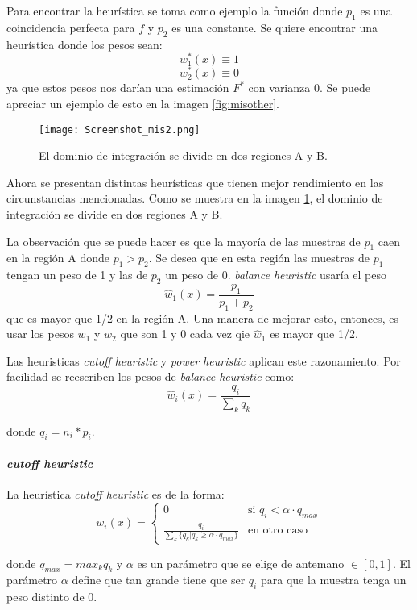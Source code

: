 \documentclass{article}
\begin{document}
Para encontrar la heurística se toma como ejemplo la función donde $p_{1}$ es una coincidencia perfecta para $f$ y $p_{2}$ es una constante.
Se quiere encontrar una heurística donde los pesos sean:
$$w^{*}_{1}(x) \equiv 1$$
$$w^{*}_{2}(x) \equiv 0$$
ya que estos pesos nos darían una estimación $F^{*}$ con varianza 0.
Se puede apreciar un ejemplo de esto en la imagen \ref{fig:misother}.

\begin{figure}[H]
\centering
\texttt{[image: Screenshot\_mis2.png]}
\caption{El dominio de integración se divide en dos regiones A y B.}
\label{fig:misother2}
\end{figure}

Ahora se presentan distintas heurísticas que tienen mejor rendimiento en las circunstancias mencionadas.
Como se muestra en la imagen \ref{fig:misother2}, el dominio de integración se divide en dos regiones A y B.

La observación que se puede hacer es que la mayoría de las muestras de $p_{1}$ caen en la región A donde $p_{1} > p_{2}$.
Se desea que en esta región las muestras de $p_{1}$ tengan un peso de 1 y las de $p_{2}$ un peso de 0.
\textit{balance heuristic} usaría el peso
$$ \hat{w}_{1}(x) = \frac{p_1}{p_1 + p_2} $$
que es mayor que 1/2 en la región A. Una manera de mejorar esto, entonces, es usar los pesos $w_{1}$ y $w_{2}$ que son 1 y 0 cada vez qie $\hat{w}_{1}$ es mayor que 1/2.

Las heuristicas \textit{cutoff heuristic} y \textit{power heuristic} aplican este razonamiento.
Por facilidad se reescriben los pesos de \textit{balance heuristic} como:
$$ \hat{w}_{i}(x) = \frac{q_{i}}{\sum_{k} q_{k}} $$

donde $q_{i} = n_{i} * p_{i}$.

\paragraph{\textit{cutoff heuristic}} La heurística \textit{cutoff heuristic} es de la forma:
$$ w_{i}(x) = \begin{cases} 0 & \text{si } q_{i} < \alpha \cdot q_{max} \\ \frac{q_{i}}{\sum_{k} \{ q_{k} | q_{k} \geq \alpha \cdot q_{max} \}} & \text{en otro caso} \end{cases}$$

donde $q_{max} = max_{k} q_{k}$ y $\alpha$ es un parámetro que se elige de antemano $\in [0, 1]$.
El parámetro $\alpha$ define que tan grande tiene que ser $q_{i}$ para que la muestra tenga un peso distinto de 0.
\end{document}
